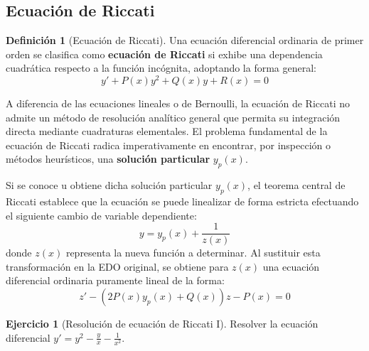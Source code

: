 \documentclass[11pt,a4paper]{article}
\theoremstyle{definition}
\newtheorem{definition}{Definición}[section]
\newtheorem{exercise}{Ejercicio}[section]
\theoremstyle{plain}
\begin{document}
\subsection{Ecuación de Riccati}

\begin{definition}[Ecuación de Riccati]
Una ecuación diferencial ordinaria de primer orden se clasifica como \textbf{ecuación de Riccati} si exhibe una dependencia cuadrática respecto a la función incógnita, adoptando la forma general:
$$ y' + P(x)y^2 + Q(x)y + R(x) = 0 $$
\end{definition}

A diferencia de las ecuaciones lineales o de Bernoulli, la ecuación de Riccati no admite un método de resolución analítico general que permita su integración directa mediante cuadraturas elementales. El problema fundamental de la ecuación de Riccati radica imperativamente en encontrar, por inspección o métodos heurísticos, una \textbf{solución particular} $y_p(x)$.

Si se conoce u obtiene dicha solución particular $y_p(x)$, el teorema central de Riccati establece que la ecuación se puede linealizar de forma estricta efectuando el siguiente cambio de variable dependiente:
$$ y = y_p(x) + \frac{1}{z(x)} $$
donde $z(x)$ representa la nueva función a determinar. Al sustituir esta transformación en la EDO original, se obtiene para $z(x)$ una ecuación diferencial ordinaria puramente lineal de la forma:
$$ z' - (2P(x)y_p(x) + Q(x))z - P(x) = 0 $$

\begin{exercise}[Resolución de ecuación de Riccati I]
Resolver la ecuación diferencial $y' = y^2 - \frac{y}{x} - \frac{1}{x^2}$.
\end{exercise}
\end{document}
